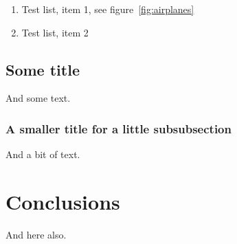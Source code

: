 \documentclass[11pt,a4paper]{article}
\begin{document}
\begin{enumerate}
\item Test list, item 1, see figure~\ref{fig:airplanes}
\item Test list, item 2
\end{enumerate}





\subsection{Some title}

And some text.

\subsubsection{A smaller title for a little subsubsection}

And a bit of text.


\section{Conclusions}
\label{section:conclusions}

And here also.


\end{document}
